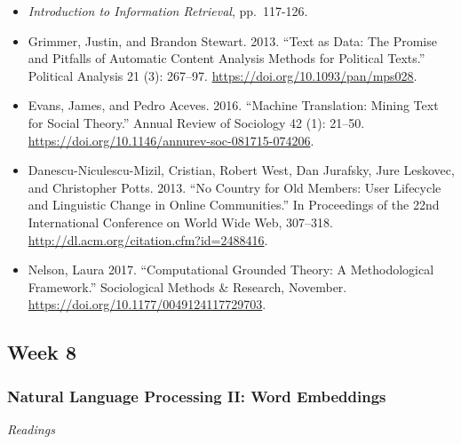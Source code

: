 \documentclass[
  10pt,
]{article}
\providecommand{\tightlist}{%
  \setlength{\itemsep}{0pt}\setlength{\parskip}{0pt}}
\begin{document}
\begin{itemize}
\tightlist
\item
  \emph{Introduction to Information Retrieval}, pp.~117-126.
\item
  Grimmer, Justin, and Brandon Stewart. 2013. ``Text as Data: The
  Promise and Pitfalls of Automatic Content Analysis Methods for
  Political Texts.'' Political Analysis 21 (3): 267--97.
  \url{https://doi.org/10.1093/pan/mps028}.
\item
  Evans, James, and Pedro Aceves. 2016. ``Machine Translation: Mining
  Text for Social Theory.'' Annual Review of Sociology 42 (1): 21--50.
  \url{https://doi.org/10.1146/annurev-soc-081715-074206}.
\item
  Danescu-Niculescu-Mizil, Cristian, Robert West, Dan Jurafsky, Jure
  Leskovec, and Christopher Potts. 2013. ``No Country for Old Members:
  User Lifecycle and Linguistic Change in Online Communities.'' In
  Proceedings of the 22nd International Conference on World Wide Web,
  307--318. \url{http://dl.acm.org/citation.cfm?id=2488416}.
\item
  Nelson, Laura 2017. ``Computational Grounded Theory: A Methodological
  Framework.'' Sociological Methods \& Research, November.
  \url{https://doi.org/10.1177/0049124117729703}.
\end{itemize}

\hypertarget{week-8}{%
\subsection{Week 8}\label{week-8}}

\hypertarget{natural-language-processing-ii-word-embeddings}{%
\subsubsection{Natural Language Processing II: Word
Embeddings}\label{natural-language-processing-ii-word-embeddings}}

\emph{Readings}
\end{document}
